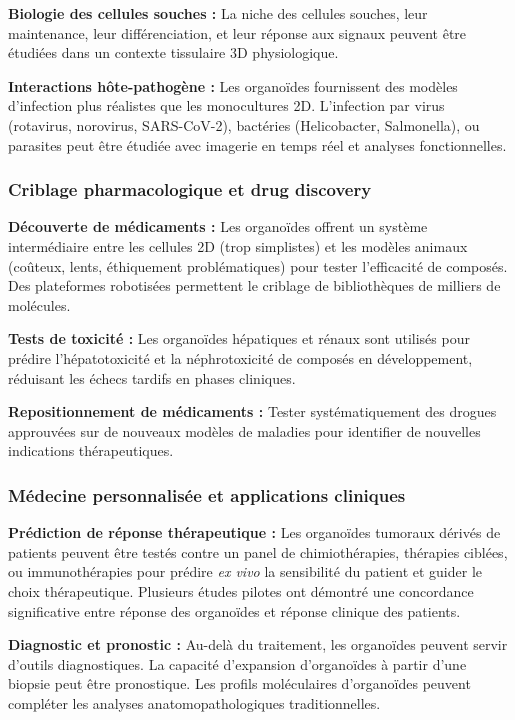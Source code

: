 \textbf{Biologie des cellules souches :}
La niche des cellules souches, leur maintenance, leur différenciation, et leur réponse aux signaux peuvent être étudiées dans un contexte tissulaire 3D physiologique.

\textbf{Interactions hôte-pathogène :}
Les organoïdes fournissent des modèles d'infection plus réalistes que les monocultures 2D. L'infection par virus (rotavirus, norovirus, SARS-CoV-2), bactéries (Helicobacter, Salmonella), ou parasites peut être étudiée avec imagerie en temps réel et analyses fonctionnelles.

\subsubsection{Criblage pharmacologique et drug discovery}

\textbf{Découverte de médicaments :}
Les organoïdes offrent un système intermédiaire entre les cellules 2D (trop simplistes) et les modèles animaux (coûteux, lents, éthiquement problématiques) pour tester l'efficacité de composés. Des plateformes robotisées permettent le criblage de bibliothèques de milliers de molécules.

\textbf{Tests de toxicité :}
Les organoïdes hépatiques et rénaux sont utilisés pour prédire l'hépatotoxicité et la néphrotoxicité de composés en développement, réduisant les échecs tardifs en phases cliniques.

\textbf{Repositionnement de médicaments :}
Tester systématiquement des drogues approuvées sur de nouveaux modèles de maladies pour identifier de nouvelles indications thérapeutiques.

\subsubsection{Médecine personnalisée et applications cliniques}

\textbf{Prédiction de réponse thérapeutique :}
Les organoïdes tumoraux dérivés de patients peuvent être testés contre un panel de chimiothérapies, thérapies ciblées, ou immunothérapies pour prédire \textit{ex vivo} la sensibilité du patient et guider le choix thérapeutique. Plusieurs études pilotes ont démontré une concordance significative entre réponse des organoïdes et réponse clinique des patients.

\textbf{Diagnostic et pronostic :}
Au-delà du traitement, les organoïdes peuvent servir d'outils diagnostiques. La capacité d'expansion d'organoïdes à partir d'une biopsie peut être pronostique. Les profils moléculaires d'organoïdes peuvent compléter les analyses anatomopathologiques traditionnelles.

